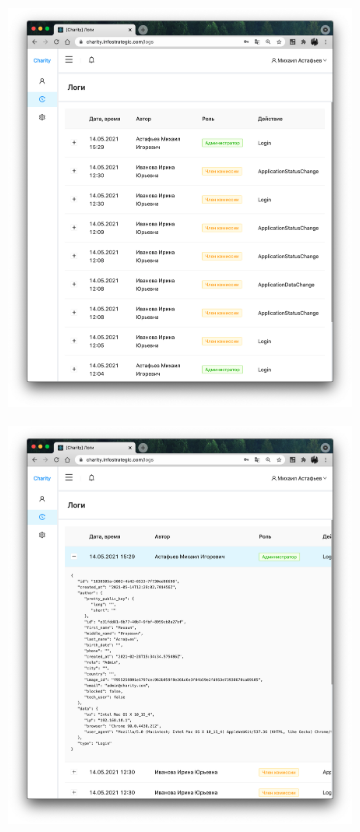 \documentclass[a4paper,12pt,reqno]{article}
\begin{document}
	\begin{figure}[H]
		\centering
		\begin{subfigure}[b]{0.475\linewidth}
			\includegraphics[width=\linewidth]{img/ro/logs.png}
		\end{subfigure}
		\begin{subfigure}[b]{0.475\linewidth}
			\includegraphics[width=\linewidth]{img/ro/logs_open.png}

\end{subfigure}
\end{figure}
\end{document}
